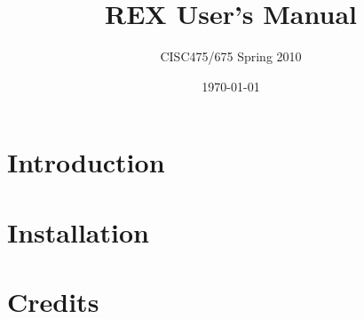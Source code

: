 \documentclass{article}
\author{CISC475/675 Spring 2010}
\title{REX User's Manual}
\date{\today}
\begin{document}
\maketitle
\tableofcontents
\newpage

\section{Introduction}

\section{Installation}

\section{Credits}
\end{document}
